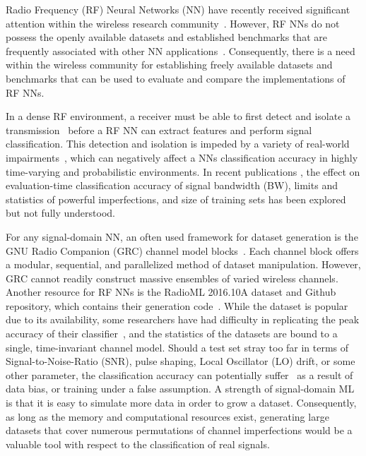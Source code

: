 Radio Frequency (RF) Neural Networks (NN) have recently received significant attention within the wireless research community~\cite{wang2017deep, 8054694}. However, RF NNs do not possess the openly available datasets and established benchmarks that are frequently associated with other NN applications~\cite{o2016radio, wang2017deep}. Consequently, there is a need within the wireless community for establishing freely available datasets and benchmarks that can be used to evaluate and compare the implementations of RF NNs.

In a dense RF environment, a receiver must be able to first detect and isolate a transmission~\cite{pahlavan2005wireless} before a RF NN
can extract features and perform signal classification. This detection and isolation is impeded by a variety of real-world impairments~\cite{tsb88tia, rappaport1996wireless}, which can negatively affect a NNs classification accuracy in highly time-varying and probabilistic environments. In recent publications \cite{o2016radio, 8170853}, the effect on evaluation-time classification accuracy of signal bandwidth (BW),
limits and statistics of powerful imperfections, and size of training sets has been explored but not fully understood.

For any signal-domain NN, an often used framework for dataset generation is the GNU Radio Companion (GRC) channel model blocks~\cite{o2016radio}. Each channel block offers a modular, sequential, and parallelized method of dataset manipulation. However, GRC cannot readily construct massive ensembles of varied wireless channels. Another resource for RF NNs is the RadioML 2016.10A dataset and Github repository, which contains their generation code~\cite{o2016radio}. While the dataset is popular due to its availability, some researchers have had difficulty in replicating the peak accuracy of their classifier~\cite{o2016convolutional}, and the statistics of the datasets are bound to a single, time-invariant channel model. Should a test set stray too far in terms of Signal-to-Noise-Ratio (SNR), pulse shaping, Local Oscillator (LO) drift, or some other parameter, the classification accuracy can potentially suffer~\cite{8170853} as a result of data bias, or training under a false assumption. A strength of signal-domain ML is that it is easy to simulate more data in order to grow a dataset. Consequently, as long as the memory and computational resources exist, generating large datasets that cover numerous permutations of channel imperfections would be a valuable tool with respect to the classification of real signals.


